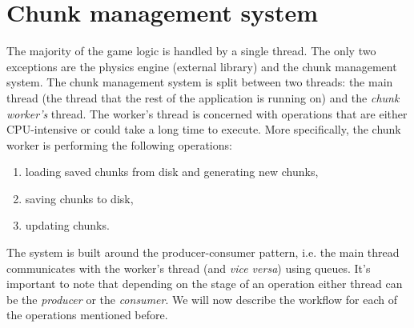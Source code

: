 \section{Chunk management system}\label{sec:chunk-worker}
The majority of the game logic is handled by a single thread.
The only two exceptions are the physics engine (external library) and the chunk management system.
The chunk management system is split between two threads: the main thread (the thread that the rest of the application is running on) and the \textit{chunk worker's} thread.
The worker's thread is concerned with operations that are either CPU-intensive or could take a long time to execute.
More specifically, the chunk worker is performing the following operations:
\begin{enumerate}
    \item loading saved chunks from disk and generating new chunks,
    \item saving chunks to disk,
    \item updating chunks.
\end{enumerate}
The system is built around the producer-consumer pattern, i.e. the main thread communicates with the worker's thread (and \textit{vice versa}) using queues.
It's important to note that depending on the stage of an operation either thread can be the \textit{producer} or the \textit{consumer}.
We will now describe the workflow for each of the operations mentioned before.



